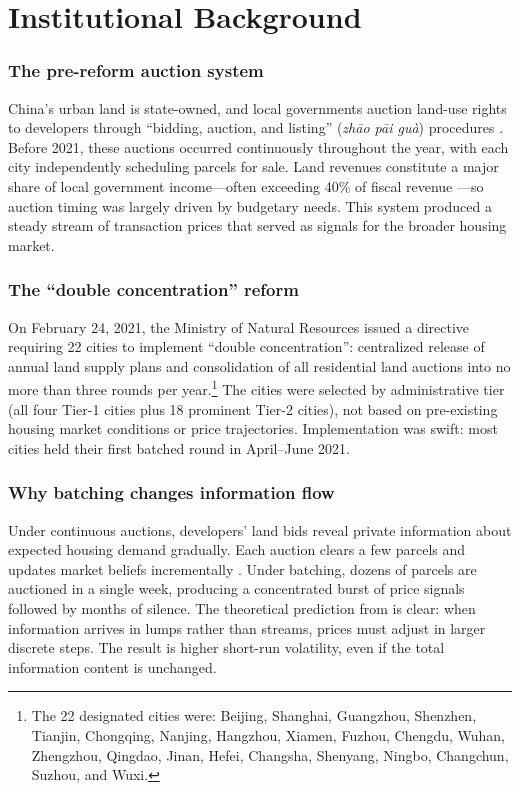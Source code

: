 \documentclass[12pt]{article}
\begin{document}
\section{Institutional Background}

\subsubsection*{The pre-reform auction system} China's urban land is state-owned, and local governments auction land-use rights to developers through ``bidding, auction, and listing'' (\textit{zh\=ao p\={a}i gu\`{a}}) procedures \citep{cai2017land}. Before 2021, these auctions occurred continuously throughout the year, with each city independently scheduling parcels for sale. Land revenues constitute a major share of local government income---often exceeding 40\% of fiscal revenue \citep{wu2015land}---so auction timing was largely driven by budgetary needs. This system produced a steady stream of transaction prices that served as signals for the broader housing market.

\subsubsection*{The ``double concentration'' reform} On February 24, 2021, the Ministry of Natural Resources issued a directive requiring 22 cities to implement ``double concentration'': centralized release of annual land supply plans and consolidation of all residential land auctions into no more than three rounds per year.\footnote{The 22 designated cities were: Beijing, Shanghai, Guangzhou, Shenzhen, Tianjin, Chongqing, Nanjing, Hangzhou, Xiamen, Fuzhou, Chengdu, Wuhan, Zhengzhou, Qingdao, Jinan, Hefei, Changsha, Shenyang, Ningbo, Changchun, Suzhou, and Wuxi.} The cities were selected by administrative tier (all four Tier-1 cities plus 18 prominent Tier-2 cities), not based on pre-existing housing market conditions or price trajectories. Implementation was swift: most cities held their first batched round in April--June 2021.

\subsubsection*{Why batching changes information flow} Under continuous auctions, developers' land bids reveal private information about expected housing demand gradually. Each auction clears a few parcels and updates market beliefs incrementally \citep{glosten1985bid}. Under batching, dozens of parcels are auctioned in a single week, producing a concentrated burst of price signals followed by months of silence. The theoretical prediction from \citet{grossman1980impossibility} is clear: when information arrives in lumps rather than streams, prices must adjust in larger discrete steps. The result is higher short-run volatility, even if the total information content is unchanged.
\end{document}
